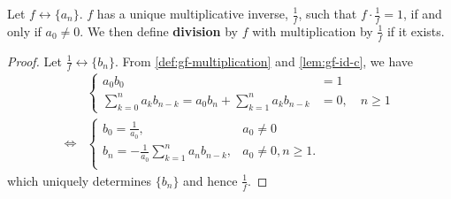 \documentclass[a4paper, 12pt]{report}
\begin{document}
\begin{thm}\label{thm:gf-mult-inv}
Let $f \longleftrightarrow \{a_n\}$. $f$ has a unique multiplicative inverse, $\frac{1}{f}$, such that $f \cdot \frac{1}{f} = 1$, if and only if $a_0 \neq 0$. We then define \textbf{division} by $f$ with multiplication by $\frac{1}{f}$ if it exists.
\end{thm}
\begin{proof}
Let $\frac{1}{f} \longleftrightarrow \{b_n\}$. From \cref{def:gf-multiplication} and \cref{lem:gf-id-c}, we have
\begin{align*}
    &\begin{cases}
        a_0 b_0 &= 1\\
        \sum_{k = 0}^n a_k b_{n - k} = a_0 b_n + \sum_{k = 1}^{n} a_k b_{n - k} &= 0, \quad n \geq 1
    \end{cases}\\
    \iff &\begin{cases}
        b_0 = \frac{1}{a_0}, &a_0 \neq 0\\
        b_n = -\frac{1}{a_0} \sum_{k = 1}^{n} a_n b_{n - k}, &a_0 \neq 0, n \geq 1.\\
    \end{cases}
\end{align*}
which uniquely determines $\{b_n\}$ and hence $\frac{1}{f}$.
\end{proof}
\end{document}
